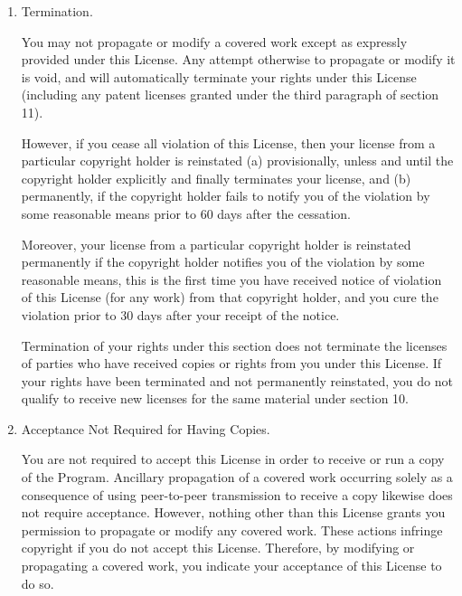 \documentclass[10pt,a4paper,ngerman,titlepage,tocindentauto]{article}
\begin{document}
\begin{multicols}{3}
{\begin{enumerate}
					If you add terms to a covered work in accord with this section, you
					must place, in the relevant source files, a statement of the
					additional terms that apply to those files, or a notice indicating
					where to find the applicable terms.

					Additional terms, permissive or non-permissive, may be stated in the
					form of a separately written license, or stated as exceptions;
					the above requirements apply either way.

					\item Termination.

					You may not propagate or modify a covered work except as expressly
					provided under this License.  Any attempt otherwise to propagate or
					modify it is void, and will automatically terminate your rights under
					this License (including any patent licenses granted under the third
					paragraph of section 11).

					However, if you cease all violation of this License, then your
					license from a particular copyright holder is reinstated (a)
					provisionally, unless and until the copyright holder explicitly and
					finally terminates your license, and (b) permanently, if the copyright
					holder fails to notify you of the violation by some reasonable means
					prior to 60 days after the cessation.

					Moreover, your license from a particular copyright holder is
					reinstated permanently if the copyright holder notifies you of the
					violation by some reasonable means, this is the first time you have
					received notice of violation of this License (for any work) from that
					copyright holder, and you cure the violation prior to 30 days after
					your receipt of the notice.

					Termination of your rights under this section does not terminate the
					licenses of parties who have received copies or rights from you under
					this License.  If your rights have been terminated and not permanently
					reinstated, you do not qualify to receive new licenses for the same
					material under section 10.

					\item Acceptance Not Required for Having Copies.

					You are not required to accept this License in order to receive or
					run a copy of the Program.  Ancillary propagation of a covered work
					occurring solely as a consequence of using peer-to-peer transmission
					to receive a copy likewise does not require acceptance.  However,
					nothing other than this License grants you permission to propagate or
					modify any covered work.  These actions infringe copyright if you do
					not accept this License.  Therefore, by modifying or propagating a
					covered work, you indicate your acceptance of this License to do so.


\end{enumerate}}
\end{multicols}
\end{document}
